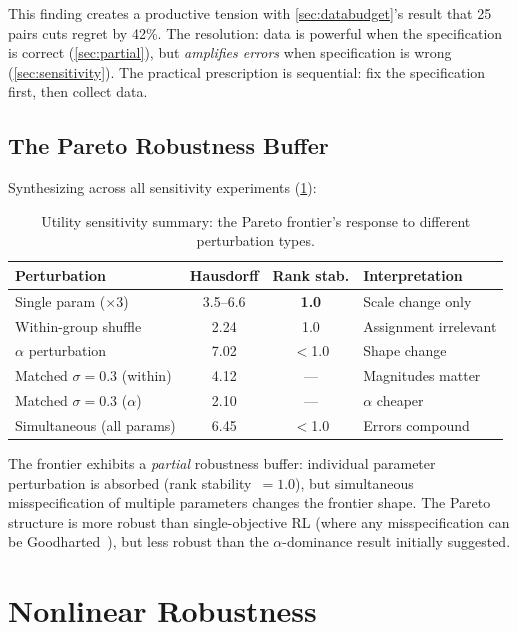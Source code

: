 \documentclass[11pt,letterpaper]{article}
\begin{document}
This finding creates a productive tension with
\cref{sec:databudget}'s result that 25 pairs cuts regret by 42\%.
The resolution: data is powerful when the specification is correct
(\cref{sec:partial}), but \emph{amplifies errors} when specification is
wrong (\cref{sec:sensitivity}). The practical prescription is sequential: fix the
specification first, then collect data.

\subsection{The Pareto Robustness Buffer}

Synthesizing across all sensitivity experiments (\cref{tab:sensitivity}):

\begin{table}[t]
  \caption{Utility sensitivity summary: the Pareto frontier's response
    to different perturbation types.}
  \label{tab:sensitivity}
  \centering\small
  \begin{tabular}{lccl}
    \toprule
    \textbf{Perturbation} & \textbf{Hausdorff} & \textbf{Rank stab.} & \textbf{Interpretation} \\
    \midrule
    Single param ($\times 3$) & 3.5--6.6 & \textbf{1.0} & Scale change only \\
    Within-group shuffle & 2.24 & 1.0 & Assignment irrelevant \\
    $\alpha$ perturbation & 7.02 & $<$1.0 & Shape change \\
    Matched $\sigma = 0.3$ (within) & 4.12 & --- & Magnitudes matter \\
    Matched $\sigma = 0.3$ ($\alpha$) & 2.10 & --- & $\alpha$ cheaper \\
    Simultaneous (all params) & 6.45 & $<$1.0 & Errors compound \\
    \bottomrule
  \end{tabular}
\end{table}

The frontier exhibits a \emph{partial} robustness buffer: individual
parameter perturbation is absorbed (rank stability~$= 1.0$), but
simultaneous misspecification of multiple parameters changes the
frontier shape. The Pareto structure is more robust than
single-objective RL (where any misspecification can be
Goodharted~\cite{skalse2024goodhart}), but less robust than the
$\alpha$-dominance result initially suggested.

\section{Nonlinear Robustness}
\label{sec:nonlinear}
\end{document}
